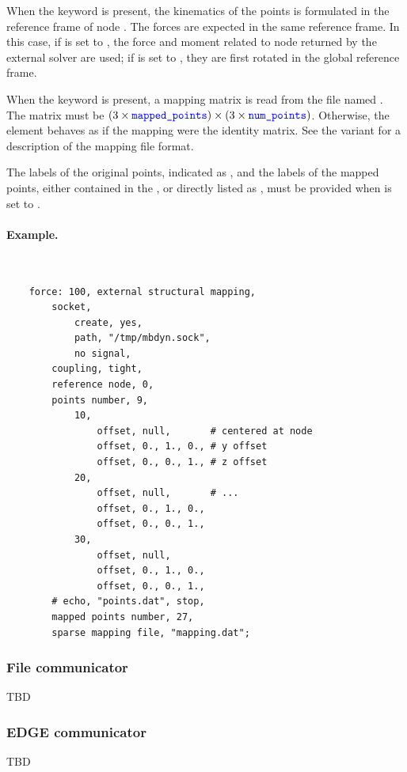 When the  keyword is present, the kinematics
of the points is formulated in the reference frame of node
.
The forces are expected in the same reference frame.
In this case, if  is set to ,
the force and moment related to node  
returned by the external solver are used;
if  is set to ,
they are first rotated in the global reference frame.

When the  keyword is present,
a mapping matrix is read from the file named .
The matrix must be
$(3 \times \textcolor{blue}{\texttt{mapped\_points}}) \times (3 \times \textcolor{blue}{\texttt{num\_points}})$.
Otherwise, the element behaves as if the mapping were the identity matrix.
See the 
variant for a description of the mapping file format.

The labels of the original points, indicated as ,
and the labels of the mapped points, either contained
in the ,
or directly listed as , must be provided
when  is set to .

\paragraph{Example.} \
\begin{verbatim}
    force: 100, external structural mapping,
        socket,
            create, yes,
            path, "/tmp/mbdyn.sock",
            no signal,
        coupling, tight,
        reference node, 0,
        points number, 9,
            10,
                offset, null,       # centered at node
                offset, 0., 1., 0., # y offset
                offset, 0., 0., 1., # z offset
            20,
                offset, null,       # ...
                offset, 0., 1., 0.,
                offset, 0., 0., 1.,
            30,
                offset, null,
                offset, 0., 1., 0.,
                offset, 0., 0., 1.,
        # echo, "points.dat", stop,
        mapped points number, 27,
        sparse mapping file, "mapping.dat";
\end{verbatim}

\subsubsection{File communicator}
TBD

\subsubsection{EDGE communicator}
TBD

